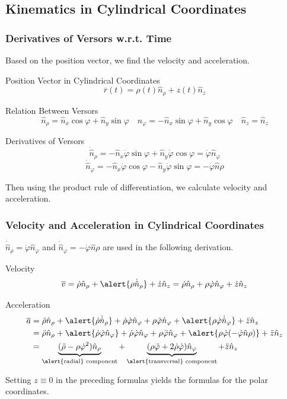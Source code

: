 \subsection{Kinematics in Cylindrical Coordinates}
\begin{frame}
\frametitle{Derivatives of Versors w.r.t. Time}
Based on the \alert{position vector}, we find the \alert{velocity} and \alert{acceleration}.
\begin{block}{Position Vector in Cylindrical Coordinates}
\[\overline{r}(t)=\rho(t)\hat n_\rho+z(t)\hat n_z\]
\end{block}
\begin{block}{Relation Between Versors}
\[\hat n_\rho=\hat n_x\cos\varphi+\hat n_y\sin\varphi\quad \hat n_\varphi=-\hat n_x\sin\varphi+\hat n_y\cos\varphi\quad \hat n_z=\hat n_z\]
\end{block}
\begin{block}{Derivatives of Versors}
\[\dot{\hat{n}}_\rho=-\hat n_x\dot\varphi\sin\varphi+\hat n_y\dot \varphi\cos\varphi=\dot\varphi\hat n_\varphi \]
\[\dot{\hat{n}}_\varphi=-\hat n_x\dot\varphi\cos\varphi-\hat n_y\dot\varphi\sin\varphi=-\dot\varphi \hat n\rho\]
\end{block}
Then using the \alert{product rule} of differentiation, we calculate velocity and acceleration.
\end{frame}
\begin{frame}
\frametitle{Velocity and Acceleration in Cylindrical Coordinates}
\alert{$\dot{\hat{n}}_\rho=\dot\varphi\hat n_\varphi$} and \alert{$\dot{\hat{n}}_\varphi=-\dot\varphi \hat n\rho$} are used in the following derivation.
\begin{block}{Velocity}
\[\overline{v}=\dot\rho\hat n_\rho+\alert{\rho\dot{\hat{n}}_{\rho}}+\dot z\hat n_z=\dot\rho\hat n_\rho+\rho\dot\varphi\hat n_\varphi+\dot z\hat n_z\]
\end{block}
\begin{block}{Acceleration}
\begin{align*}\overline{a}&=\ddot\rho\hat n_\rho+\alert{\dot\rho\dot{\hat{n}}_\rho}+\dot\rho\dot\varphi\hat n_\varphi+\rho\ddot\varphi\hat n_\varphi+\alert{\rho\dot\varphi\dot{\hat{n}}_\varphi}+\ddot z\hat n_z\\
&=\ddot\rho\hat n_\rho+\alert{\dot\rho  \dot\varphi\hat n_\varphi}+\dot\rho\dot\varphi\hat n_\varphi+\rho\ddot\varphi\hat n_\varphi+\alert{\rho\dot\varphi   (-\dot\varphi \hat n\rho)}+\ddot z\hat n_z\\
&=\underbrace{(\ddot\rho-\rho\dot\varphi^2)\hat n_\rho}_{\text{\alert{radial} component}}+\underbrace{(\rho\ddot\varphi+2\dot\rho\dot\varphi)\hat n_\varphi}_{\text{\alert{transversal} component}}+\ddot z\hat n_z
\end{align*}
\end{block}
Setting \alert{$z\equiv 0$} in the preceding formulas yields the formulas for the \alert{polar coordinates}.
\end{frame}
